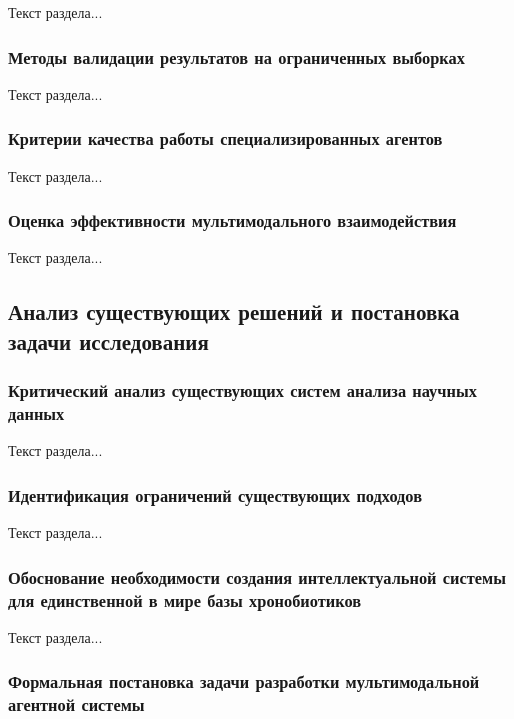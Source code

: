 Текст раздела...

\subsubsection{Методы валидации результатов на ограниченных выборках}

Текст раздела...

\subsubsection{Критерии качества работы специализированных агентов}

Текст раздела...

\subsubsection{Оценка эффективности мультимодального взаимодействия}

Текст раздела...

\subsection{Анализ существующих решений и постановка задачи исследования}

\subsubsection{Критический анализ существующих систем анализа научных данных}

Текст раздела...

\subsubsection{Идентификация ограничений существующих подходов}

Текст раздела...

\subsubsection{Обоснование необходимости создания интеллектуальной системы для единственной в мире базы хронобиотиков}

Текст раздела...

\subsubsection{Формальная постановка задачи разработки мультимодальной агентной системы}

